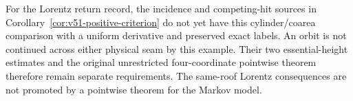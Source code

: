 For the Lorentz return record, the incidence and competing-hit sources
in Corollary~\ref{cor:v51-positive-criterion} do not yet have this
cylinder/coarea comparison with a uniform derivative and preserved
exact labels. An orbit is not continued across either physical seam by
this example. Their two essential-height estimates and the original
unrestricted four-coordinate pointwise theorem therefore remain separate
requirements. The same-roof Lorentz consequences are not promoted by a
pointwise theorem for the Markov model.
